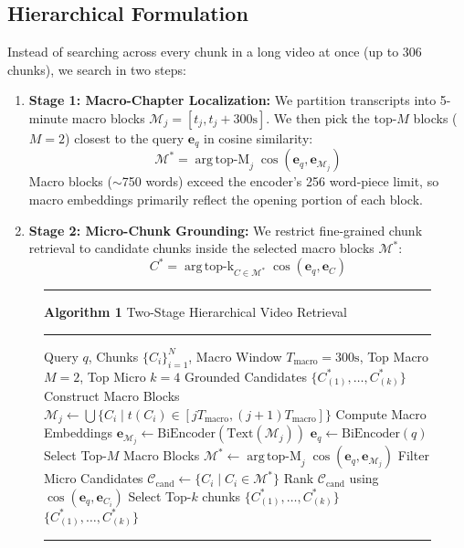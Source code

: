 \documentclass[conference]{IEEEtran}
\begin{document}
\subsection{Hierarchical Formulation}
Instead of searching across every chunk in a long video at once (up to 306 chunks), we search in two steps:
\begin{enumerate}
    \item \textbf{Stage 1: Macro-Chapter Localization:} We partition transcripts into 5-minute macro blocks $\mathcal{M}_j = [t_j, t_j + 300\text{s}]$. We then pick the top-$M$ blocks ($M=2$) closest to the query $\mathbf{e}_q$ in cosine similarity:
    \begin{equation}
    \mathcal{M}^* = \operatorname{arg\,top-M}_{j} \cos(\mathbf{e}_q, \mathbf{e}_{\mathcal{M}_j})
    \end{equation}
    Macro blocks ($\sim$750 words) exceed the encoder's 256 word-piece limit, so macro embeddings primarily reflect the opening portion of each block.
    \item \textbf{Stage 2: Micro-Chunk Grounding:} We restrict fine-grained chunk retrieval to candidate chunks inside the selected macro blocks $\mathcal{M}^*$:
    \begin{equation}
    C^* = \operatorname{arg\,top-k}_{C \in \mathcal{M}^*} \cos(\mathbf{e}_q, \mathbf{e}_C)
    \end{equation}
\end{enumerate}

\begin{figure}[htbp]
\hrule\vspace{2pt}
\textbf{Algorithm 1} Two-Stage Hierarchical Video Retrieval
\vspace{2pt}\hrule\vspace{3pt}
\begin{algorithmic}[1]
\REQUIRE Query $q$, Chunks $\{C_i\}_{i=1}^N$, Macro Window $T_{\text{macro}}=300\text{s}$, Top Macro $M=2$, Top Micro $k=4$
\ENSURE Grounded Candidates $\{C^*_{(1)}, \dots, C^*_{(k)}\}$
\STATE Construct Macro Blocks $\mathcal{M}_j \leftarrow \bigcup \{C_i \mid t(C_i) \in [j T_{\text{macro}}, (j+1) T_{\text{macro}}]\}$
\STATE Compute Macro Embeddings $\mathbf{e}_{\mathcal{M}_j} \leftarrow \text{BiEncoder}(\text{Text}(\mathcal{M}_j))$
\STATE $\mathbf{e}_q \leftarrow \text{BiEncoder}(q)$
\STATE Select Top-$M$ Macro Blocks $\mathcal{M}^* \leftarrow \operatorname{arg\,top-M}_j \cos(\mathbf{e}_q, \mathbf{e}_{\mathcal{M}_j})$
\STATE Filter Micro Candidates $\mathcal{C}_{\text{cand}} \leftarrow \{C_i \mid C_i \in \mathcal{M}^*\}$
\STATE Rank $\mathcal{C}_{\text{cand}}$ using $\cos(\mathbf{e}_q, \mathbf{e}_{C_i})$
\STATE Select Top-$k$ chunks $\{C^*_{(1)}, \dots, C^*_{(k)}\}$
\RETURN $\{C^*_{(1)}, \dots, C^*_{(k)}\}$
\end{algorithmic}
\vspace{2pt}\hrule
\end{figure}
\end{document}
